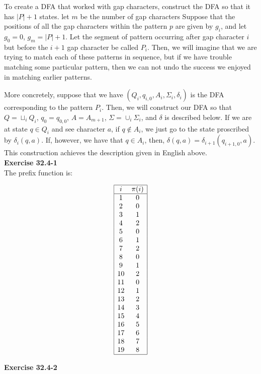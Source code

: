 \documentclass{article}
\begin{document}
To create a DFA that worked with gap characters, construct the DFA so that it has $|P|+1$ states. let $m$ be the number of gap characters Suppose that the positions of all the gap characters within the pattern $p$ are given by $g_i$, and let $g_0=0$, $g_m = |P|+1$. Let the segment of pattern occurring after gap character $i$ but before the $i+1$ gap character be called $P_i$. Then, we will imagine that we are trying to match each of these patterns in sequence, but if we have trouble matching some particular pattern, then we can not undo the success we enjoyed in matching earlier patterns. 

More concretely, suppose that we have $(Q_i,q_{i,0},A_i,\Sigma_i,\delta_i)$ is the DFA corresponding to the pattern $P_i$. Then, we will construct our DFA so that $Q = \sqcup_i Q_i$, $q_0 = q_{0,0}$, $A = A_{m+1}$, $\Sigma = \cup_i \Sigma_i$, and $\delta$ is described below. If we are at state $q\in Q_i$ and see character $a$, if $q\not\in A_i$, we just go to the state proscribed by $\delta_i(q,a)$. If, however, we have that $q \in A_i$, then, $\delta(q,a) = \delta_{i+1}(q_{i+1,0},a)$. This construction achieves the description given in English above.\\


\noindent\textbf{Exercise 32.4-1}\\

The prefix function is:

\[
\begin{array}{|cc|}
\hline
i &\pi(i)\\
\hline
1&0\\
2&0\\
3&1\\
4&2\\
5&0\\
6&1\\
7&2\\
8&0\\
9&1\\
10&2\\
11&0\\
12&1\\
13&2\\
14&3\\
15&4\\
16&5\\
17&6\\
18&7\\
19&8\\
\hline
\end{array}
\]

\noindent\textbf{Exercise 32.4-2}\\
\end{document}
